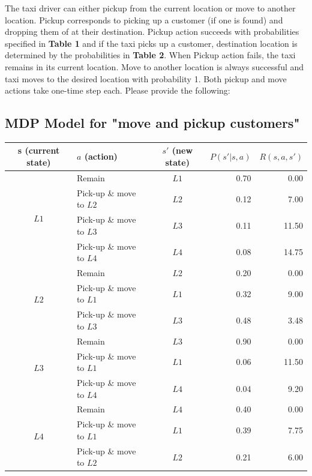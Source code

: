 \documentclass[12pt, letterpaper]{article}
\newcommand{\mybox}[1]{\par\noindent\colorbox{shadecolor}
{\parbox{\dimexpr\textwidth-2\fboxsep\relax}{#1}}}
\begin{document}
\mybox{The taxi driver can either pickup from the current location or move to another location. 
Pickup corresponds to picking up a customer (if one is found) and dropping them of at their destination. 
Pickup action succeeds with probabilities specified in \textbf{Table 1} and if the taxi picks up a customer, destination location is determined by the probabilities in \textbf{Table 2}. 
When Pickup action fails, the taxi remains in its current location. 
Move to another location is always successful and taxi moves to the desired location with probability 1.
Both pickup and move actions take one-time step each. Please provide the following:}

\subsection{MDP Model for "move and pickup customers"}

\begin{center}
    \begin{tabular}{|c|l|c|r|r|}
    \hline
    s (current state)       &$a$ (action) & $s'$ (new state) & $P(s'|s,a)$ & $R(s,a,s')$ 
    \\ \hline
    \multirow{4}{*}{$L1$}   & Remain & $L1$ & 0.70 & 0.00 \\ \cline{2-5} 
                            & Pick-up \& move to $L2$ & $L2$ & 0.12 & 7.00 \\ \cline{2-5} 
                            & Pick-up \& move to $L3$ & $L3$ & 0.11 & 11.50 \\ \cline{2-5} 
                            & Pick-up \& move to $L4$ & $L4$ & 0.08 & 14.75 \\ \cline{2-5}
    \hline           
    \multirow{3}{*}{$L2$}   & Remain & $L2$ & 0.20 & 0.00 \\ \cline{2-5} 
                            & Pick-up \& move to $L1$ & $L1$ & 0.32 & 9.00 \\ \cline{2-5} 
                            & Pick-up \& move to $L3$ & $L3$ & 0.48 & 3.48 \\ \cline{2-5}
    \hline
    \multirow{3}{*}{$L3$}   & Remain & $L3$ & 0.90 & 0.00 \\ \cline{2-5} 
                            & Pick-up \& move to $L1$ & $L1$ & 0.06 & 11.50 \\ \cline{2-5} 
                            & Pick-up \& move to $L4$ & $L4$ & 0.04 & 9.20 \\ \cline{2-5} 
    \hline
    \multirow{3}{*}{$L4$}   & Remain & $L4$ & 0.40 & 0.00 \\ \cline{2-5} 
                            & Pick-up \& move to $L1$ & $L1$ & 0.39 & 7.75 \\ \cline{2-5} 
                            & Pick-up \& move to $L2$ & $L2$ & 0.21 & 6.00 \\ \cline{2-5}
    \hline
    \end{tabular}
\end{center}
\end{document}
